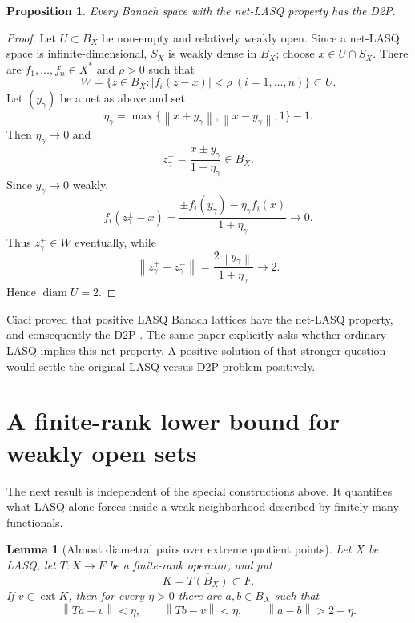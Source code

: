 \documentclass[11pt]{article}
\newtheorem{proposition}[theorem]{Proposition}
\newtheorem{lemma}[theorem]{Lemma}
\newcommand{\diam}{\operatorname{diam}}
\newcommand{\ext}{\operatorname{ext}}
\newcommand{\norm}[1]{\left\lVert #1\right\rVert}
\newcommand{\abs}[1]{\left\lvert #1\right\rvert}
\begin{document}
\begin{proposition}
\label{prop:net-implies-d2p}
Every Banach space with the net-LASQ property has the D2P.
\end{proposition}

\begin{proof}
Let $U\subset B_X$ be non-empty and relatively weakly open.  Since a net-LASQ space is infinite-dimensional, $S_X$ is weakly dense in $B_X$; choose $x\in U\cap S_X$.  There are $f_1,\dots,f_n\in X^*$ and $\rho>0$ such that
\[
 W=\{z\in B_X:\abs{f_i(z-x)}<\rho\ (i=1,\dots,n)\}\subset U.
\]
Let $(y_\gamma)$ be a net as above and set
\[
 \eta_\gamma=
 \max\{\norm{x+y_\gamma},\norm{x-y_\gamma},1\}-1.
\]
Then $\eta_\gamma\to0$ and
\[
 z_\gamma^\pm=\frac{x\pm y_\gamma}{1+\eta_\gamma}\in B_X.
\]
Since $y_\gamma\to0$ weakly,
\[
 f_i(z_\gamma^\pm-x)
 =\frac{\pm f_i(y_\gamma)-\eta_\gamma f_i(x)}{1+\eta_\gamma}
 \longrightarrow0.
\]
Thus $z_\gamma^\pm\in W$ eventually, while
\[
 \norm{z_\gamma^+-z_\gamma^-}
 =\frac{2\norm{y_\gamma}}{1+\eta_\gamma}\longrightarrow2.
\]
Hence $\diam U=2$.
\end{proof}

Ciaci proved that positive LASQ Banach lattices have the net-LASQ property, and consequently the D2P \cite{Ciaci2023}.  The same paper explicitly asks whether ordinary LASQ implies this net property.  A positive solution of that stronger question would settle the original LASQ-versus-D2P problem positively.

\section{A finite-rank lower bound for weakly open sets}
\label{sec:finite-rank}

The next result is independent of the special constructions above.  It quantifies what LASQ alone forces inside a weak neighborhood described by finitely many functionals.

\begin{lemma}[Almost diametral pairs over extreme quotient points]
\label{lem:extreme-lifting}
Let $X$ be LASQ, let $T:X\to F$ be a finite-rank operator, and put
\[
 K=\overline{T(B_X)}\subset F.
\]
If $v\in\ext K$, then for every $\eta>0$ there are $a,b\in B_X$ such that
\[
 \norm{Ta-v}<\eta,
 \qquad
 \norm{Tb-v}<\eta,
 \qquad
 \norm{a-b}>2-\eta.
\]
\end{lemma}
\end{document}
